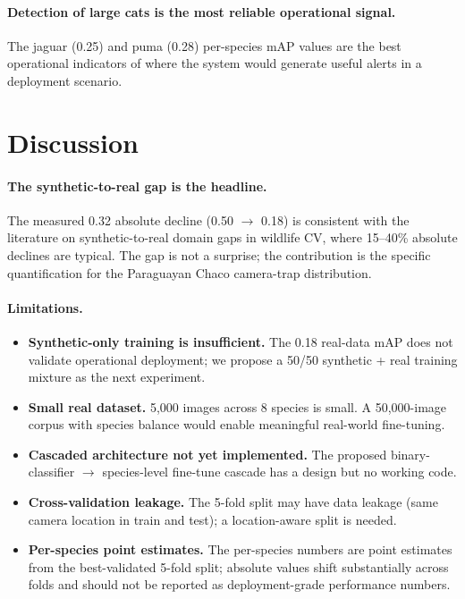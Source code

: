 \paragraph{Detection of large cats is the most reliable operational
signal.} The jaguar (0.25) and puma (0.28) per-species mAP values are
the best operational indicators of where the system would generate
useful alerts in a deployment scenario.

\section{Discussion}
\label{sec:kai-discussion}

\paragraph{The synthetic-to-real gap is the headline.} The measured
0.32 absolute decline (0.50 $\rightarrow$ 0.18) is consistent with the
literature on synthetic-to-real domain gaps in wildlife CV, where
15--40\% absolute declines are typical. The gap is not a surprise; the
contribution is the specific quantification for the Paraguayan Chaco
camera-trap distribution.

\paragraph{Limitations.}
\begin{itemize}
    \item \textbf{Synthetic-only training is insufficient.} The
    0.18 real-data mAP does not validate operational deployment; we
    propose a 50/50 synthetic + real training mixture as the next
    experiment.
    \item \textbf{Small real dataset.} 5{,}000 images across 8 species
    is small. A 50{,}000-image corpus with species balance would enable
    meaningful real-world fine-tuning.
    \item \textbf{Cascaded architecture not yet implemented.} The
    proposed binary-classifier $\rightarrow$ species-level fine-tune
    cascade has a design but no working code.
    \item \textbf{Cross-validation leakage.} The 5-fold split may have
    data leakage (same camera location in train and test); a
    location-aware split is needed.
    \item \textbf{Per-species point estimates.} The per-species numbers
    are point estimates from the best-validated 5-fold split; absolute
    values shift substantially across folds and should not be reported
    as deployment-grade performance numbers.
\end{itemize}

